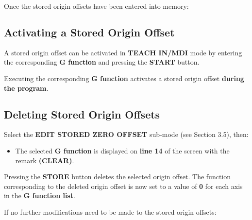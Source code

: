 \vspace{.5cm}

Once the stored origin offsets have been entered into memory:

\begin{itemize}
\end{itemize}

\vspace{.5cm}

\subsection{Activating a Stored Origin Offset}

A stored origin offset can be activated in \textbf{TEACH IN/MDI} mode by entering the corresponding \textbf{G function} and pressing the \textbf{START} button.

Executing the corresponding \textbf{G function} activates a stored origin offset \textbf{during the program}.

\subsection{Deleting Stored Origin Offsets}

Select the \textbf{EDIT STORED ZERO OFFSET} sub-mode (see Section 3.5), then:

\begin{itemize}
    \vspace{.6cm}
    \item The selected \textbf{G function} is displayed on \textbf{line 14} of the screen with the remark \textbf{(CLEAR)}.
\end{itemize}

\vspace{.5cm}

Pressing the \textbf{STORE} button deletes the selected origin offset. The function corresponding to the deleted origin offset is now set to a value of \textbf{0} for each axis in the \textbf{G function list}.

If no further modifications need to be made to the stored origin offsets:

